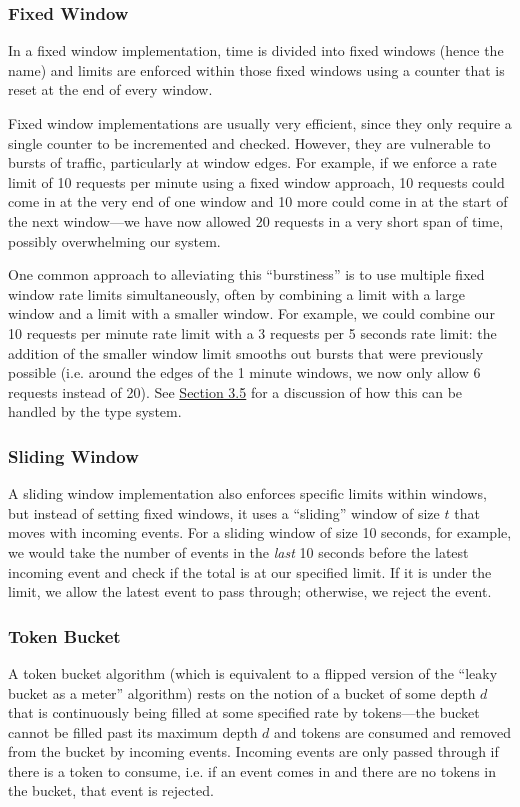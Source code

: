 \documentclass[acmsmall,nonacm,screen]{acmart}
\begin{document}
\subsubsection{Fixed Window}
In a fixed window implementation, time is divided into fixed windows (hence the name) and limits are enforced within those fixed windows using a counter that is reset at the end of every window.

Fixed window implementations are usually very efficient, since they only require a single counter to be incremented and checked. However, they are vulnerable to bursts of traffic, particularly at window edges. For example, if we enforce a rate limit of 10 requests per minute using a fixed window approach, 10 requests could come in at the very end of one window and 10 more could come in at the start of the next window—we have now allowed 20 requests in a very short span of time, possibly overwhelming our system.

One common approach to alleviating this ``burstiness'' is to use multiple fixed window rate limits simultaneously, often by combining a limit with a large window and a limit with a smaller window. For example, we could combine our 10 requests per minute rate limit with a 3 requests per 5 seconds rate limit: the addition of the smaller window limit smooths out bursts that were previously possible (i.e. around the edges of the 1 minute windows, we now only allow 6 requests instead of 20). See \hyperlink{section.3}{Section 3.5} for a discussion of how this can be handled by the type system.

\subsubsection{Sliding Window}
A sliding window implementation also enforces specific limits within windows, but instead of setting fixed windows, it uses a ``sliding'' window of size $t$ that moves with incoming events. For a sliding window of size 10 seconds, for example, we would take the number of events in the \textit{last} 10 seconds before the latest incoming event and check if the total is at our specified limit. If it is under the limit, we allow the latest event to pass through; otherwise, we reject the event.

\subsubsection{Token Bucket}
A token bucket algorithm (which is equivalent to a flipped version of the ``leaky bucket as a meter'' algorithm) rests on the notion of a bucket of some depth $d$ that is continuously being filled at some specified rate by tokens—the bucket cannot be filled past its maximum depth $d$ and tokens are consumed and removed from the bucket by incoming events. Incoming events are only passed through if there is a token to consume, i.e. if an event comes in and there are no tokens in the bucket, that event is rejected.
\end{document}
